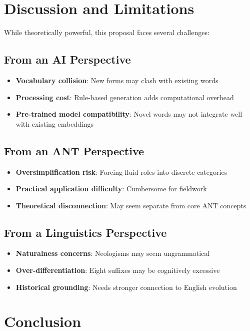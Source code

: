 \documentclass[11pt]{article}
\begin{document}
\section{Discussion and Limitations}

While theoretically powerful, this proposal faces several challenges:

\subsection{From an AI Perspective}
\begin{itemize}
\item \textbf{Vocabulary collision}: New forms may clash with existing words
\item \textbf{Processing cost}: Rule-based generation adds computational overhead
\item \textbf{Pre-trained model compatibility}: Novel words may not integrate well with existing embeddings
\end{itemize}

\subsection{From an ANT Perspective}
\begin{itemize}
\item \textbf{Oversimplification risk}: Forcing fluid roles into discrete categories
\item \textbf{Practical application difficulty}: Cumbersome for fieldwork
\item \textbf{Theoretical disconnection}: May seem separate from core ANT concepts
\end{itemize}

\subsection{From a Linguistics Perspective}
\begin{itemize}
\item \textbf{Naturalness concerns}: Neologisms may seem ungrammatical
\item \textbf{Over-differentiation}: Eight suffixes may be cognitively excessive
\item \textbf{Historical grounding}: Needs stronger connection to English evolution
\end{itemize}

\section{Conclusion}
\end{document}
